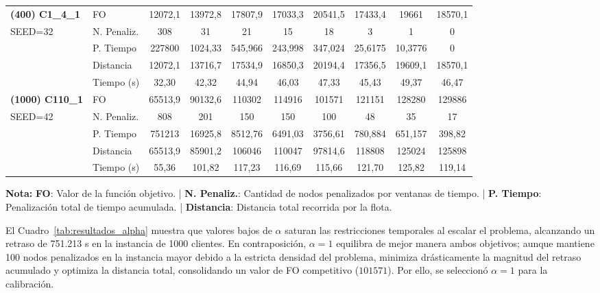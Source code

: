 \documentclass[letter, 10pt, dvipdfmx]{article}
\begin{document}
\begin{table}[htbp]
\begin{tabular}{ll cccccccc}
\textbf{(400) C1\_4\_1} & FO & 12072,1 & 13972,8 & 17807,9 & 17033,3 & 20541,5 & 17433,4 & 19661   & 18570,1 \\
SEED=32             & N. Penaliz. & 308     & 31      & 21      & 15      & 18      & 3       & 1       & 0       \\
                    & P. Tiempo   & 227800  & 1024,33 & 545,966 & 243,998 & 347,024 & 25,6175 & 10,3776 & 0       \\
                    & Distancia   & 12072,1 & 13716,7 & 17534,9 & 16850,3 & 20194,4 & 17356,5 & 19609,1 & 18570,1 \\
                    & Tiempo (s)  & 32,30   & 42,32   & 44,94   & 46,03   & 47,33   & 45,43   & 49,37   & 46,47   \\ \hline

\textbf{(1000) C110\_1}& FO & 65513,9 & 90132,6 & 110302  & 114916  & 101571  & 121151  & 128280  & 129886  \\
SEED=42             & N. Penaliz. & 808     & 201     & 150     & 150     & 100     & 48      & 35      & 17      \\
                    & P. Tiempo   & 751213  & 16925,8 & 8512,76 & 6491,03 & 3756,61 & 780,884 & 651,157 & 398,82  \\
                    & Distancia   & 65513,9 & 85901,2 & 106046  & 110047  & 97814,6 & 118808  & 125024  & 125898  \\
                    & Tiempo (s)  & 55,36   & 101,82  & 117,23  & 116,69  & 115,66  & 121,70  & 125,82  & 119,14  \\ \hline
\end{tabular}
\smallskip
\begin{minipage}{\textwidth}
\scriptsize
\textbf{Nota:} \textbf{FO}: Valor de la función objetivo. | \textbf{N. Penaliz.}: Cantidad de nodos penalizados por ventanas de tiempo. | \textbf{P. Tiempo}: Penalización total de tiempo acumulada. | \textbf{Distancia}: Distancia total recorrida por la flota.
\end{minipage}
\end{table}

\vspace{-3mm}

El Cuadro~\ref{tab:resultados_alpha} muestra que valores bajos de $\alpha$ saturan las restricciones temporales al escalar
el problema, alcanzando un retraso de 751.213 s en la instancia de 1000 clientes. En contraposición, $\alpha=1$ equilibra
de mejor manera ambos objetivos; aunque mantiene 100 nodos penalizados en la instancia mayor debido a la
estricta densidad del problema, minimiza drásticamente la magnitud del retraso acumulado y optimiza la distancia total,
consolidando un valor de FO competitivo ($101571$). Por ello, se seleccionó $\alpha=1$ para la calibración.
\end{document}
